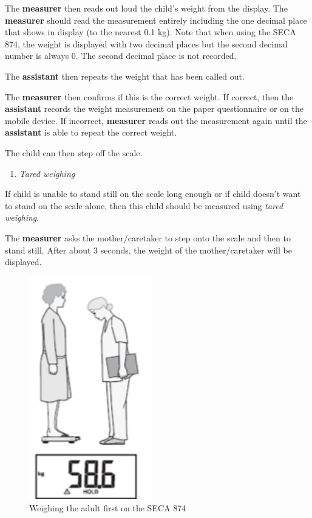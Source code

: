 \documentclass[12pt,]{book}
\providecommand{\tightlist}{%
  \setlength{\itemsep}{0pt}\setlength{\parskip}{0pt}}
\theoremstyle{definition}
\theoremstyle{definition}
\theoremstyle{definition}
\theoremstyle{remark}
\begin{document}
The \textbf{measurer} then reads out loud the child's weight from the
display. The \textbf{measurer} should read the measurement entirely
including the one decimal place that shows in display (to the nearest
0.1 kg). Note that when using the SECA 874, the weight is displayed with
two decimal places but the second decimal number is always 0. The second
decimal place is not recorded.

The \textbf{assistant} then repeats the weight that has been called out.

The \textbf{measurer} then confirms if this is the correct weight. If
correct, then the \textbf{assistant} records the weight measurement on
the paper questionnaire or on the mobile device. If incorrect,
\textbf{measurer} reads out the measurement again until the
\textbf{assistant} is able to repeat the correct weight.

The child can then step off the scale.

\begin{enumerate}
\def\labelenumi{\alph{enumi}.}
\setcounter{enumi}{1}
\tightlist
\item
  \emph{Tared weighing}
\end{enumerate}

If child is unable to stand still on the scale long enough or if child
doesn't want to stand on the scale alone, then this child should be
measured using \emph{tared weighing}.

The \textbf{measurer} asks the mother/caretaker to step onto the scale
and then to stand still. After about 3 seconds, the weight of the
mother/caretaker will be displayed.

\begin{figure}

{\centering \includegraphics[width=2.11in]{images/seca874adult} 

}

\caption{Weighing the adult first on the SECA 874}\label{fig:weight9}
\end{figure}
\end{document}
